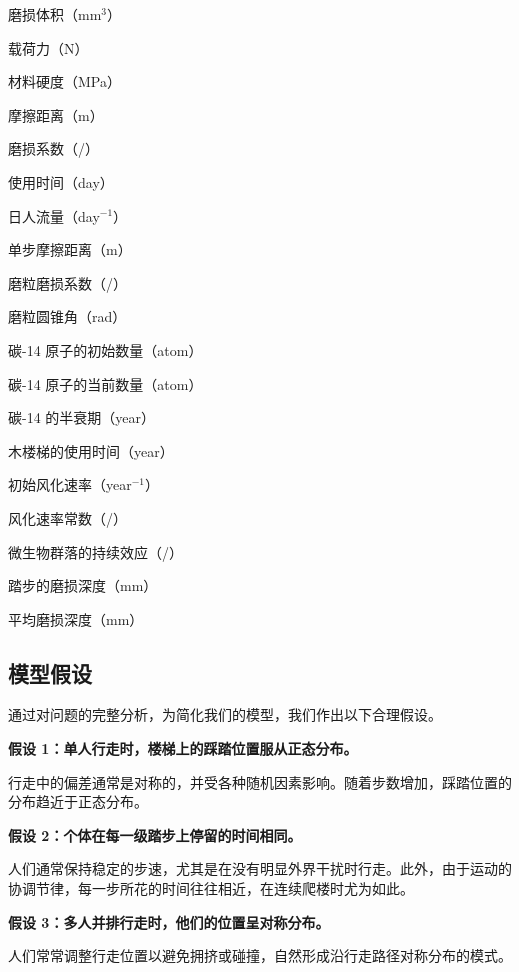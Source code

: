 \documentclass[11pt,a4paper]{ctexart}
\begin{document}
\begin{description}[leftmargin=4.5em,labelwidth=4em,itemsep=1pt,topsep=2pt]
\item[$V$] 磨损体积（mm$^3$）
\item[$P$] 载荷力（N）
\item[$H$] 材料硬度（MPa）
\item[$L$] 摩擦距离（m）
\item[$K$] 磨损系数（/）
\item[$t$] 使用时间（day）
\item[$n$] 日人流量（day$^{-1}$）
\item[$d$] 单步摩擦距离（m）
\item[$K_{abr}$] 磨粒磨损系数（/）
\item[$\theta$] 磨粒圆锥角（rad）
\item[$N_0$] 碳-14 原子的初始数量（atom）
\item[$N$] 碳-14 原子的当前数量（atom）
\item[$T_0$] 碳-14 的半衰期（year）
\item[$t_w$] 木楼梯的使用时间（year）
\item[$W_0$] 初始风化速率（year$^{-1}$）
\item[$\lambda$] 风化速率常数（/）
\item[$\beta$] 微生物群落的持续效应（/）
\item[$d_w$] 踏步的磨损深度（mm）
\item[$\mu$] 平均磨损深度（mm）
\end{description}

\subsection{模型假设}

通过对问题的完整分析，为简化我们的模型，我们作出以下合理假设。

\textbf{假设 1：单人行走时，楼梯上的踩踏位置服从正态分布。}

行走中的偏差通常是对称的，并受各种随机因素影响。随着步数增加，踩踏位置的分布趋近于正态分布。

\textbf{假设 2：个体在每一级踏步上停留的时间相同。}

人们通常保持稳定的步速，尤其是在没有明显外界干扰时行走。此外，由于运动的协调节律，每一步所花的时间往往相近，在连续爬楼时尤为如此。

\textbf{假设 3：多人并排行走时，他们的位置呈对称分布。}

人们常常调整行走位置以避免拥挤或碰撞，自然形成沿行走路径对称分布的模式。
\end{document}
